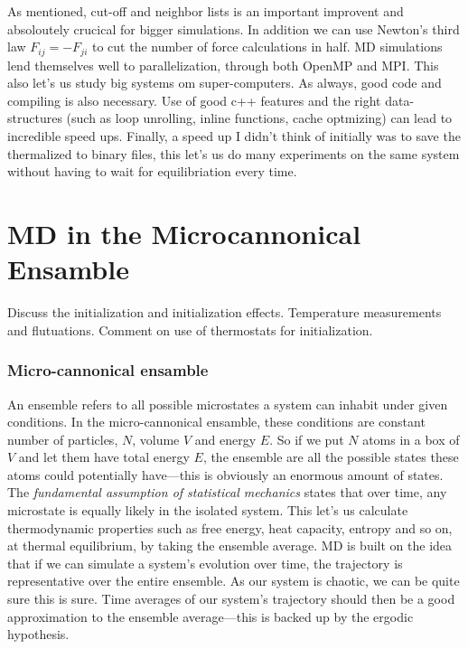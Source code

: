 \documentclass[a4paper, 11pt, notitlepage, english]{article}
\begin{document}
As mentioned, cut-off and neighbor lists is an important improvent and absoloutely crucical for bigger simulations. In addition we can use Newton's third law $F_{ij} = -F_{ji}$ to cut the number of force calculations in half. MD simulations lend themselves well to parallelization, through both OpenMP and MPI. This also let's us study big systems om super-computers. As always, good code and compiling is also necessary. Use of good c++ features and the right data-structures (such as loop unrolling, inline functions, cache optmizing) can lead to incredible speed ups. Finally, a speed up I didn't think of initially was to save the thermalized to binary files, this let's us do many experiments on the same system without having to wait for equilibriation every time.

\clearpage


\section{MD in the Microcannonical Ensamble}
Discuss the initialization and initialization effects. Temperature measurements and flutuations. Comment on use of thermostats for initialization.

\subsubsection*{Micro-cannonical ensamble}

An ensemble refers to all possible microstates a system can inhabit under given conditions. In the micro-cannonical ensamble, these conditions are constant number of particles, $N$, volume $V$ and energy $E$. So if we put $N$ atoms in a box of $V$ and let them have total energy $E$, the ensemble are all the possible states these atoms could potentially have---this is obviously an enormous amount of states. The \emph{fundamental assumption of statistical mechanics} states that over time, any microstate is equally likely in the isolated system. This let's us calculate thermodynamic properties such as free energy, heat capacity, entropy and so on, at thermal equilibrium, by taking the ensemble average. MD is built on the idea that if we can simulate a system's evolution over time, the trajectory is representative over the entire ensemble. As our system is chaotic, we can be quite sure this is sure. Time averages of our system's trajectory should then be a good approximation to the ensemble average---this is backed up by the ergodic hypothesis.
\end{document}
